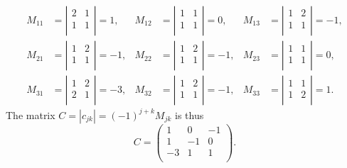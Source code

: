 \begin{align*}
  M_{11} &= \left| \begin{array}{cc}
  2 & 1\\
  1 & 1\\
  \end{array} \right| = 1, & M_{12} &= \left| \begin{array}{cc}
  1 & 1\\
  1 & 1\\
\end{array} \right| = 0, & M_{13} &= \left| \begin{array}{cc}
1 & 2\\
1 & 1\\
\end{array} \right| = -1, \\
  M_{21} &= \left| \begin{array}{cc}
  1 & 2\\
  1 & 1\\
\end{array} \right| = -1, & M_{22} &= \left| \begin{array}{cc}
1 & 2\\
1 & 1\\
\end{array} \right| = -1, & M_{23} &= \left| \begin{array}{cc}
1 & 1\\
1 & 1\\
\end{array} \right| = 0, \\
    M_{31} &= \left| \begin{array}{cc}
    1 & 2\\
    2 & 1\\
    \end{array} \right| = -3, & M_{32} &= \left| \begin{array}{cc}
  1 & 2\\
  1 & 1\\
  \end{array} \right| = -1, & M_{33} &= \left| \begin{array}{cc}
1 & 1\\
1 & 2\\
\end{array} \right| = 1
.\end{align*}
The matrix $C = \left| c_{jk} \right| = (-1)^{j+k}M_{jk}$ is thus
\[ 
C = \begin{pmatrix}
1 & 0 & -1\\
1 & -1 & 0\\
-3 & 1 & 1\\
\end{pmatrix}
.\]
